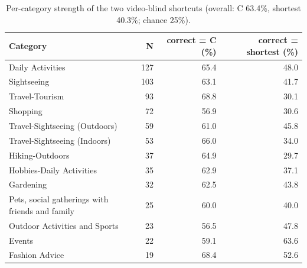 \begin{table}[t]
\centering
\small
\caption{Per-category strength of the two video-blind shortcuts (overall: C 63.4\%, shortest 40.3\%; chance 25\%).}
\label{tab:shortcuts_by_cat}
\begin{tabular}{lrrr}
\toprule
Category & N & correct = C (\%) & correct = shortest (\%) \\
\midrule
Daily Activities & 127 & 65.4 & 48.0 \\
Sightseeing & 103 & 63.1 & 41.7 \\
Travel-Tourism & 93 & 68.8 & 30.1 \\
Shopping & 72 & 56.9 & 30.6 \\
Travel-Sightseeing (Outdoors) & 59 & 61.0 & 45.8 \\
Travel-Sightseeing (Indoors) & 53 & 66.0 & 34.0 \\
Hiking-Outdoors & 37 & 64.9 & 29.7 \\
Hobbies-Daily Activities & 35 & 62.9 & 37.1 \\
Gardening & 32 & 62.5 & 43.8 \\
Pets, social gatherings with friends and family & 25 & 60.0 & 40.0 \\
Outdoor Activities and Sports & 23 & 56.5 & 47.8 \\
Events & 22 & 59.1 & 63.6 \\
Fashion Advice & 19 & 68.4 & 52.6 \\
\bottomrule
\end{tabular}
\end{table}

